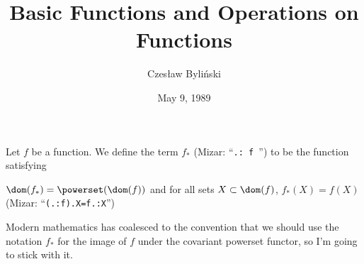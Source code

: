 \documentclass{article}
\title{Basic Functions and Operations on Functions}
\author{Czes{\l}aw Byli\'nski}
\date{May 9, 1989}
\begin{document}
\maketitle

\begin{thm}
\item\label{funct3:1} 
\item\label{funct3:2} 
\item\label{funct3:3} 
\item\label{funct3:4} 
\item\label{funct3:5} 
\item\label{funct3:6} 
\end{thm}

\begin{definition}
Let $f$ be a function.
We define the term $f_{*}$ (Mizar: ``\verb#.: f #'') to be the function satisfying
\begin{defn}
\item $\dom(f_{*})=\powerset(\dom(f))$ and
  for all sets $X\subset\dom(f)$, $f_{*}(X)=f(X)$ (Mizar: ``\verb#(.:f).X=f.:X#'')
\end{defn}
\end{definition}

\begin{remark}
Modern mathematics has coalesced to the convention that we should use
the notation $f_{*}$ for the image of $f$ under the covariant powerset
functor, so I'm going to stick with it.
\end{remark}
\end{document}
